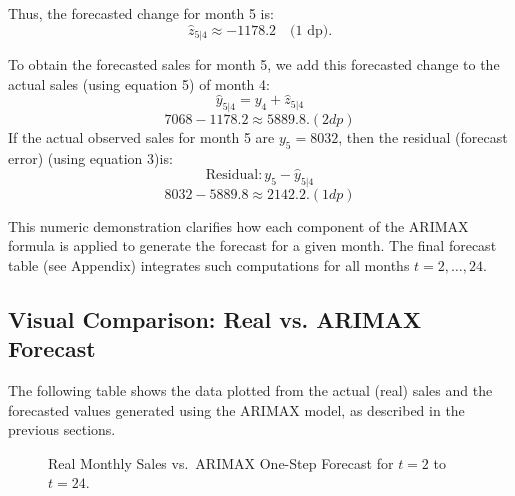 \documentclass{article}
\begin{document}
Thus, the forecasted change for month 5 is:
\[
\hat{z}_{5|4} \approx -1178.2 \quad \text{(1 dp)}.
\]

To obtain the forecasted sales for month 5, we add this forecasted change to the actual sales (using equation 5) of month 4:
\[
\hat{y}_{5|4} = y_4 + \hat{z}_{5|4}\] \[ 7068 - 1178.2 \approx 5889.8. (2dp)
\]
If the actual observed sales for month 5 are \(y_5 = 8032\), then the residual (forecast error) (using equation 3)is:
\[
\text{Residual} :y_5 - \hat{y}_{5|4} \]
\[ 8032 - 5889.8 \approx 2142.2. (1 dp)
\]

This numeric demonstration clarifies how each component of the ARIMAX formula is applied to generate the forecast for a given month. The final forecast table (see Appendix) integrates such computations for all months \(t=2,\dots,24\).


\subsection{Visual Comparison: Real vs. ARIMAX Forecast}
The following table shows the data plotted from the actual (real) sales and the forecasted values generated using the ARIMAX model, as described in the previous sections.
\begin{figure}[H]
\centering
{}
\caption{Real Monthly Sales vs.\ ARIMAX One-Step Forecast for \(t=2\) to \(t=24\).}
\label{fig:arimax_graph}
\end{figure}
\end{document}
